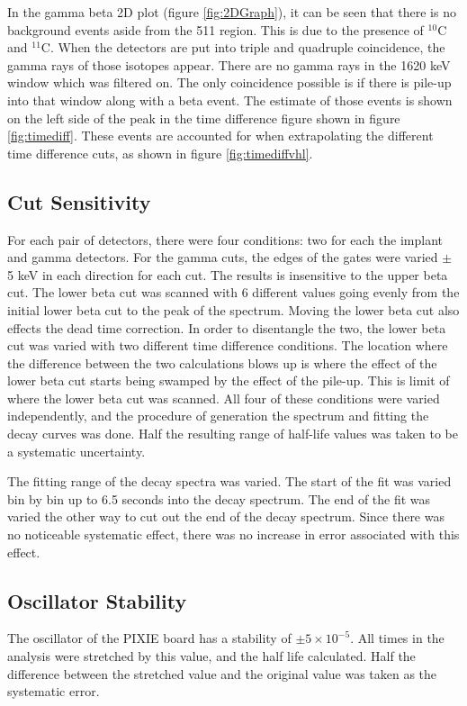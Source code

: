 \documentclass[MaxHughesThesis.tex]{subfiles}
\begin{document}
In the gamma beta 2D plot (figure \ref{fig:2DGraph}), it can be seen that there is no background events aside from the 511 region.
This is due to the presence of $^{10}$C and $^{11}$C.
When the detectors are put into triple and quadruple coincidence, the gamma rays of those isotopes appear.
There are no gamma rays in the 1620 keV window which was filtered on.
The only coincidence possible is if there is pile-up into that window along with a beta event.
The estimate of those events is shown on the left side of the peak in the time difference figure shown in figure \ref{fig:timediff}.  
These events are accounted for when extrapolating the different time difference cuts, as shown in figure \ref{fig:timediffvhl}.

\subsection{Cut Sensitivity}
For each pair of detectors, there were four conditions: two for each the implant and gamma detectors. 
For the gamma cuts, the edges of the gates were varied $\pm$ 5 keV in each direction for each cut.
The results is insensitive to the upper beta cut.
The lower beta cut was scanned with 6 different values going evenly from the initial lower beta cut to the peak of the spectrum.
Moving the lower beta cut also effects the dead time correction.
In order to disentangle the two, the lower beta cut was varied with two different time difference conditions.
The location where the difference between the two calculations blows up is where the effect of the lower beta cut starts being swamped by the effect of the pile-up.
This is limit of where the lower beta cut was scanned.
All four of these conditions were varied independently, and the procedure of generation the spectrum and fitting the decay curves was done.
Half the resulting range of half-life values was taken to be a systematic uncertainty.
	
The fitting range of the decay spectra was varied. 
The start of the fit was varied bin by bin up to 6.5 seconds into the decay spectrum.
The end of the fit was varied the other way to cut out the end of the decay spectrum.
Since there was no noticeable systematic effect, there was no increase in error associated with this effect.

\subsection{Oscillator Stability}
The oscillator of the PIXIE board has a stability of $\pm 5 \times 10^{-5}$.
All times in the analysis were stretched by this value, and the half life calculated.
Half the difference between the stretched value and the original value was taken as the systematic error. 
\end{document}
